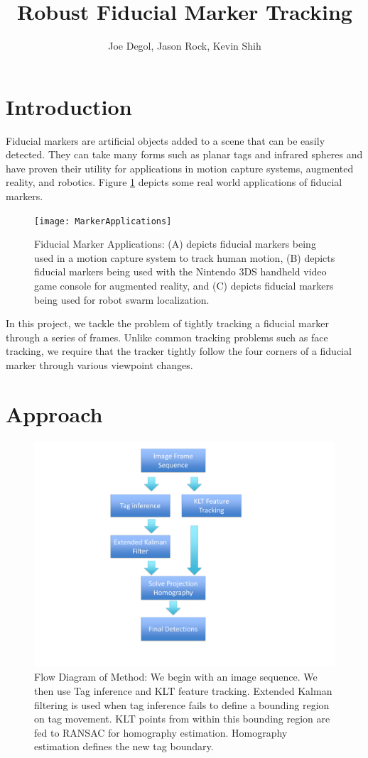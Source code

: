 \documentclass[12pt]{article}
\title{Robust Fiducial Marker Tracking}
\author{Joe Degol, Jason Rock, Kevin Shih}
\begin{document}
\maketitle

\section{Introduction}
Fiducial markers are artificial objects added to a scene that can be easily detected. They can take many forms such as planar tags and infrared spheres and have proven their utility for applications in motion capture systems, augmented reality, and robotics. Figure \ref{fig:applications} depicts some real world applications of fiducial markers.

\begin{figure}[h]
\centering
\texttt{[image: MarkerApplications]}
\caption{Fiducial Marker Applications: (A) depicts fiducial markers being used in a motion capture system to track human motion, (B) depicts fiducial markers being used with the Nintendo 3DS handheld video game console for augmented reality, and (C) depicts fiducial markers being used for robot swarm localization.}
\label{fig:applications}
\end{figure}



In this project, we tackle the problem of tightly tracking a fiducial marker through a series of frames. Unlike common tracking problems such as face tracking, we require that the tracker tightly follow the four corners of a fiducial marker through various viewpoint changes. 

\section{Approach}
\begin{figure}
\centering
\includegraphics[scale=.15]{flowchart.pdf}
\caption{Flow Diagram of Method: We begin with an image sequence. We then use Tag inference and KLT feature tracking. Extended Kalman filtering is used when tag inference fails to define a bounding region on tag movement. KLT points from within this bounding region are fed to RANSAC for homography estimation. Homography estimation defines the new tag boundary.}
\end{figure}
\end{document}
